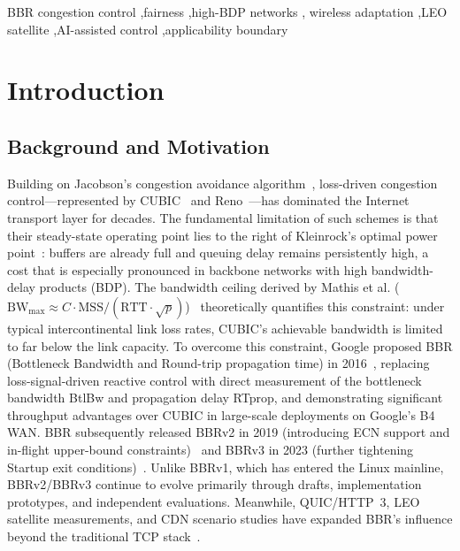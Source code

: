 \documentclass[a4paper,fleqn]{cas-sc}
\begin{document}
\begin{keywords}
BBR congestion control \sep fairness \sep high-BDP networks \sep
wireless adaptation \sep LEO satellite \sep AI-assisted control \sep applicability boundary
\end{keywords}

\maketitle

\section{Introduction}
\label{sec:intro}

\subsection{Background and Motivation}
\label{sec:background}

Building on Jacobson's congestion avoidance algorithm~\citep{jacobson1988congestion},
loss-driven congestion control---represented by CUBIC~\citep{ha2008cubic} and
Reno~\citep{fall1996simulation}---has dominated the Internet transport layer for
decades. The fundamental limitation of such schemes is that their steady-state
operating point lies to the right of Kleinrock's optimal power
point~\citep{kleinrock1979power}: buffers are already full and queuing delay
remains persistently high, a cost that is especially pronounced in backbone
networks with high bandwidth-delay products (BDP). The bandwidth ceiling derived
by Mathis et al.
($\mathrm{BW}_{\max}\approx C\cdot\mathrm{MSS}/(\mathrm{RTT}\cdot\sqrt{p})$)~\citep{mathis1997macroscopic}
theoretically quantifies this constraint: under typical intercontinental link loss
rates, CUBIC's achievable bandwidth is limited to far below the link capacity.
To overcome this constraint, Google proposed BBR (Bottleneck Bandwidth and
Round-trip propagation time) in 2016~\citep{cardwell2017bbr}, replacing
loss-signal-driven reactive control with direct measurement of the bottleneck
bandwidth BtlBw and propagation delay RTprop, and demonstrating significant
throughput advantages over CUBIC in large-scale deployments on Google's B4 WAN.
BBR subsequently released BBRv2 in 2019 (introducing ECN support and in-flight
upper-bound constraints)~\citep{cardwell2019bbrv2} and BBRv3 in 2023 (further
tightening Startup exit conditions)~\citep{cardwell2023bbrv3}. Unlike BBRv1,
which has entered the Linux mainline, BBRv2/BBRv3 continue to evolve primarily
through drafts, implementation prototypes, and independent evaluations. Meanwhile,
QUIC/HTTP~3, LEO satellite measurements, and CDN scenario studies have expanded
BBR's influence beyond the traditional TCP
stack~\citep{rfc9000,rfc9002,rfc9114,deutschmann2023starlink,kamel2024starquic}.
\end{document}
